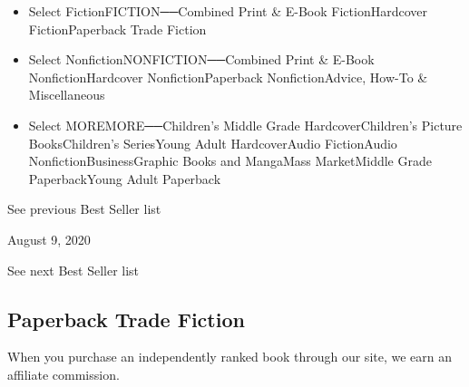 \begin{itemize}
\tightlist
\item
  Select FictionFICTION──Combined Print \& E-Book FictionHardcover
  FictionPaperback Trade Fiction
\item
  Select NonfictionNONFICTION──Combined Print \& E-Book
  NonfictionHardcover NonfictionPaperback NonfictionAdvice, How-To \&
  Miscellaneous
\item
  Select MOREMORE──Children's Middle Grade HardcoverChildren's Picture
  BooksChildren's SeriesYoung Adult HardcoverAudio FictionAudio
  NonfictionBusinessGraphic Books and MangaMass MarketMiddle Grade
  PaperbackYoung Adult Paperback
\end{itemize}

\href{/books/best-sellers/2020/08/02/trade-fiction-paperback/}{}

See previous Best Seller list

August 9, 2020

See next Best Seller list

\hypertarget{paperback-trade-fiction}{%
\subsection{Paperback Trade Fiction}\label{paperback-trade-fiction}}

When you purchase an independently ranked book through our site, we earn
an affiliate commission.

